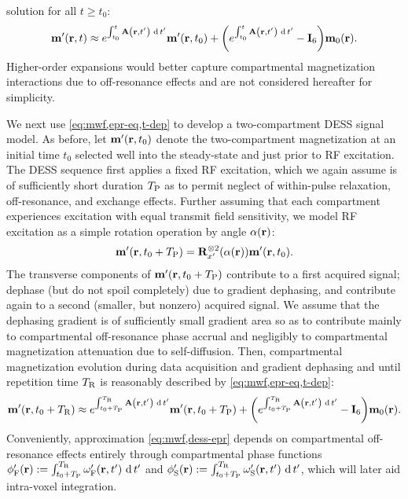 solution for all $t \geq t_0$:
\begin{align}
	\bmmp\prt \approx
		e^{\int_{t_0}^t \bmA\paren{\bmr,t'} \der{t'}} \bmmp\paren{\bmr,t_0} +
		\paren{e^{\int_{t_0}^t \bmA\paren{\bmr,t'} \der{t'}} - \eye{6}} \bmmzero\pr.
	\label{eq:mwf,epr-eq,t-dep}
\end{align}
Higher-order expansions
would better capture compartmental magnetization interactions
due to off-resonance effects
and are not considered hereafter 
for simplicity.

We next use \eqref{eq:mwf,epr-eq,t-dep}
to develop a two-compartment DESS signal model.
As before,
let $\bmmp\prtz$ denote the two-compartment magnetization 
at an initial time $t_0$
selected well into the steady-state
and just prior to RF excitation.
The DESS sequence first applies a fixed RF excitation,
which we again assume
is of sufficiently short duration $T_\mathrm{P}$ 
as to permit neglect 
of within-pulse relaxation, off-resonance, and exchange effects.
Further assuming
that each compartment experiences excitation
with equal transmit field sensitivity,
we model RF excitation as a simple rotation operation
by angle $\flip\pr$:
\begin{align}
	\bmmp\paren{\bmr,t_0+\TP} = 
		\bmRxpsix{\flip\pr} \bmmp\prtz.
		\label{eq:mwf,dess-ex}
\end{align}
The transverse components
of $\bmmp\paren{\bmr,t_0+\TP}$
contribute to a first acquired signal;
dephase (but do not spoil completely)
due to gradient dephasing,
and contribute again 
to a second (smaller, but nonzero) acquired signal.
We assume that the dephasing gradient 
is of sufficiently small gradient area
so as to contribute
mainly to compartmental off-resonance phase accrual
and negligibly to compartmental magnetization attenuation
due to self-diffusion.
Then, compartmental magnetization evolution
during data acquisition 
and gradient dephasing
and until repetition time $T_\mathrm{R}$
is reasonably described 
by \eqref{eq:mwf,epr-eq,t-dep}:
\begin{align}
	\bmmp\paren{\bmr,t_0+\TR} \approx
		e^{\int_{t_0+\TP}^{\TR} \bmA\paren{\bmr,t'} \der{t'}} \bmmp\paren{\bmr,t_0+\TP} +
		\paren{e^{\int_{t_0+\TP}^{\TR} \bmA\paren{\bmr,t'} \der{t'}} - \eye{6}} \bmmzero\pr.
	\label{eq:mwf,dess-epr}
\end{align}
Conveniently,
approximation \eqref{eq:mwf,dess-epr}
depends on compartmental off-resonance effects
entirely through compartmental phase functions
$\phipf\pr := \int_{t_0+\TP}^{\TR} \ompf\paren{\bmr,t'} \der t'$
and
$\phips\pr := \int_{t_0+\TP}^{\TR} \omps\paren{\bmr,t'} \der t'$,
which will later aid intra-voxel integration. 

